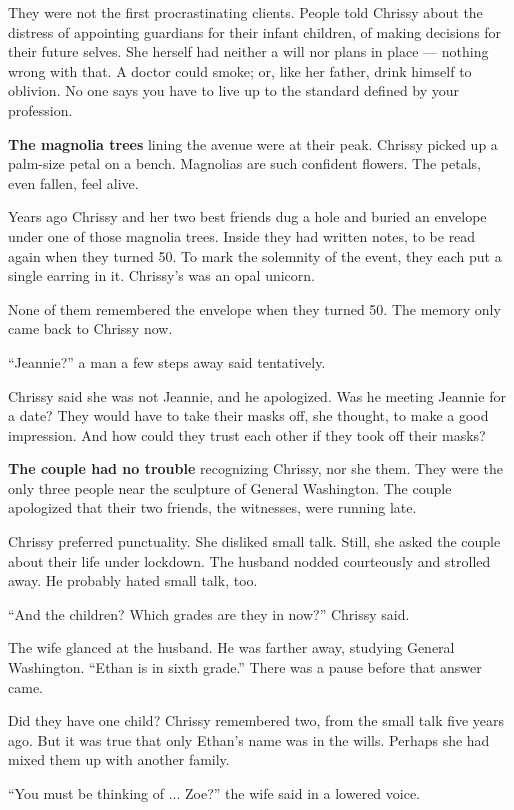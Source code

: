 They were not the first procrastinating clients. People told Chrissy
about the distress of appointing guardians for their infant children, of
making decisions for their future selves. She herself had neither a will
nor plans in place --- nothing wrong with that. A doctor could smoke;
or, like her father, drink himself to oblivion. No one says you have to
live up to the standard defined by your profession.

\textbf{The magnolia trees} lining the avenue were at their peak.
Chrissy picked up a palm-size petal on a bench. Magnolias are such
confident flowers. The petals, even fallen, feel alive.

Years ago Chrissy and her two best friends dug a hole and buried an
envelope under one of those magnolia trees. Inside they had written
notes, to be read again when they turned 50. To mark the solemnity of
the event, they each put a single earring in it. Chrissy's was an opal
unicorn.

None of them remembered the envelope when they turned 50. The memory
only came back to Chrissy now.

``Jeannie?'' a man a few steps away said tentatively.

Chrissy said she was not Jeannie, and he apologized. Was he meeting
Jeannie for a date? They would have to take their masks off, she
thought, to make a good impression. And how could they trust each other
if they took off their masks?

\textbf{The couple had no trouble} recognizing Chrissy, nor she them.
They were the only three people near the sculpture of General
Washington. The couple apologized that their two friends, the witnesses,
were running late.

Chrissy preferred punctuality. She disliked small talk. Still, she asked
the couple about their life under lockdown. The husband nodded
courteously and strolled away. He probably hated small talk, too.

``And the children? Which grades are they in now?'' Chrissy said.

The wife glanced at the husband. He was farther away, studying General
Washington. ``Ethan is in sixth grade.'' There was a pause before that
answer came.

Did they have one child? Chrissy remembered two, from the small talk
five years ago. But it was true that only Ethan's name was in the wills.
Perhaps she had mixed them up with another family.

``You must be thinking of ... Zoe?'' the wife said in a lowered voice.

